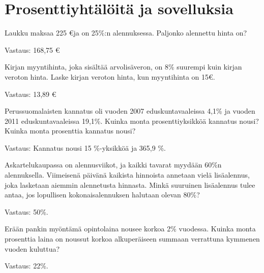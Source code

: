 \section{Prosenttiyhtälöitä ja sovelluksia}

\begin{tehtava}
    Laukku maksaa 225 \euro ja on 25\%:n alennuksessa. Paljonko alennettu hinta on?
    
    \begin{vastaus}
    Vastaus: 168,75 \euro
    \end{vastaus}
\end{tehtava}

\begin{tehtava}
    Kirjan myyntihinta, joka sisältää arvolisäveron, on 8\% suurempi kuin kirjan
    veroton hinta. Laske kirjan veroton hinta, kun myyntihinta on 15\euro.
    
    \begin{vastaus}
        Vastaus: 13,89 \euro
    \end{vastaus}
\end{tehtava}

\begin{tehtava}
    Perussuomalaisten kannatus oli vuoden 2007 eduskuntavaaleissa 4,1\% ja
    vuoden 2011 eduskuntavaaleissa 19,1\%. Kuinka monta prosenttiyksikköä kannatus nousi? Kuinka monta prosenttia kannatus nousi?
    \begin{vastaus}
    Vastaus: Kannatus nousi 15 \%-yksikköä ja 365,9 \%.
    \end{vastaus}
\end{tehtava}

\begin{tehtava}
    Askartelukaupassa on alennusviikot, ja kaikki tavarat myydään 60\%n alennuksella. Viimeisenä päivänä kaikista hinnoista annetaan 
    vielä lisäalennus, joka lasketaan aiemmin alennetusta hinnasta. Minkä suuruinen lisäalennus tulee antaa, jos lopullisen 
    kokonaisalennuksen halutaan olevan 80\%?

    \begin{vastaus}
        Vastaus: 50\%.
    \end{vastaus}
\end{tehtava}

\begin{tehtava}
    Erään pankin myöntämä opintolaina nousee korkoa 2\% vuodessa. Kuinka monta prosenttia laina on noussut korkoa alkuperäiseen 
    summaan verrattuna kymmenen vuoden kuluttua?

    \begin{vastaus}
        Vastaus: 22\%.
    \end{vastaus}
\end{tehtava}

